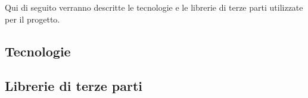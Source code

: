 \documentclass[../manuale_sviluppatore.tex]{subfiles}
\begin{document}
Qui di seguito verranno descritte le tecnologie e le librerie di terze parti utilizzate per il progetto.

\subsection{Tecnologie}

\subsection{Librerie di terze parti}
\end{document}
